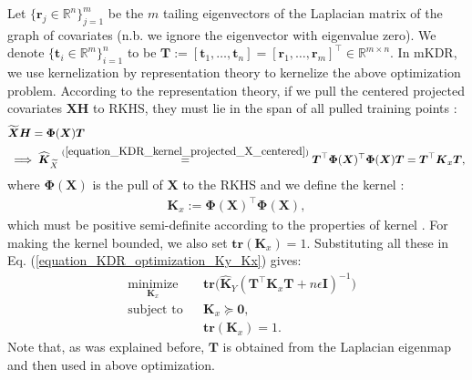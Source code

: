 \documentclass[lang=cn,10pt]{gorgeousnbook}
\numberwithin{equation}{section}%
\numberwithin{figure}{section}%
\begin{document}
Let $\{\boldsymbol{r}_j \in \mathbb{R}^n\}_{j=1}^m$ be the $m$ tailing eigenvectors of the Laplacian matrix of the graph of covariates (n.b. we ignore the eigenvector with eigenvalue zero). We denote $\{\boldsymbol{t}_i \in \mathbb{R}^m\}_{i=1}^n$ to be $\boldsymbol{T} := [\boldsymbol{t}_1, \dots, \boldsymbol{t}_n] = [\boldsymbol{r}_1, \dots, \boldsymbol{r}_m]^\top \in \mathbb{R}^{m \times n}$.
In mKDR, we use kernelization by representation theory \cite{ghojogh2021reproducing} to kernelize the above optimization problem. According to the representation theory, if we pull the centered projected covariates $\boldsymbol{X} \boldsymbol{H}$ to RKHS, they must lie in the span of all pulled training points \cite{ghojogh2021reproducing}:
\begin{align*}
&\widetilde{\boldsymbol{X}} \boldsymbol{H} = \boldsymbol{\Phi}(\boldsymbol{X}) \boldsymbol{T} \\
&\implies 
\widehat{\boldsymbol{K}}_{\widetilde{X}} \overset{(\ref{equation_KDR_kernel_projected_X_centered})}{=} \boldsymbol{T}^\top \boldsymbol{\Phi}(\boldsymbol{X})^\top \boldsymbol{\Phi}(\boldsymbol{X}) \boldsymbol{T} = \boldsymbol{T}^\top \boldsymbol{K}_x \boldsymbol{T},
\end{align*}
where $\boldsymbol{\Phi}(\boldsymbol{X})$ is the pull of $\boldsymbol{X}$ to the RKHS and we define the kernel \cite{ghojogh2021reproducing}:
\begin{align}\label{equation_KDR_kernel_Kx}
\boldsymbol{K}_x := \boldsymbol{\Phi}(\boldsymbol{X})^\top \boldsymbol{\Phi}(\boldsymbol{X}),
\end{align}
which must be positive semi-definite according to the properties of kernel \cite{ghojogh2021reproducing}. For making the kernel bounded, we also set $\textbf{tr}(\boldsymbol{K}_x) = 1$.
Substituting all these in Eq. (\ref{equation_KDR_optimization_Ky_Kx}) gives:
\begin{equation}\label{equation_KDR_optimization_Ky_Kx_2}
\begin{aligned}
& \underset{\boldsymbol{K}_x}{\text{minimize}} 
& & \textbf{tr}\big(\widehat{\boldsymbol{K}}_Y (\boldsymbol{T}^\top \boldsymbol{K}_x \boldsymbol{T} + n \epsilon \boldsymbol{I})^{-1}\big) \\
& \text{subject to}
& & \boldsymbol{K}_x \succeq \boldsymbol{0}, \\
& & & \textbf{tr}(\boldsymbol{K}_x) = 1.
\end{aligned}
\end{equation}
Note that, as was explained before, $\boldsymbol{T}$ is obtained from the Laplacian eigenmap and then used in above optimization. 
\end{document}
